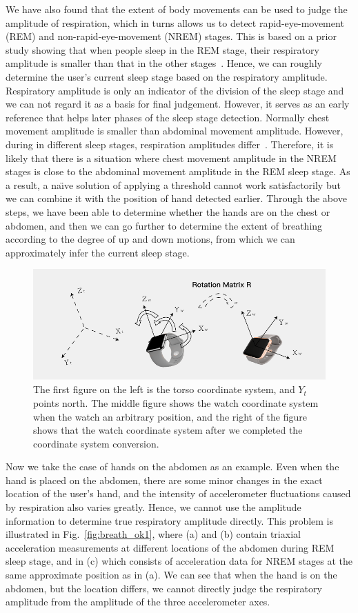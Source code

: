 We have also found that the extent of body movements can be used to judge the amplitude of respiration, which in turns allows us to detect
rapid-eye-movement (REM) and non-rapid-eye-movement (NREM) stages. This is based on a prior study showing that when people sleep in the REM
stage, their respiratory amplitude is smaller than that in the other stages~\cite{respiratory1982}. Hence, we can roughly determine the
user's current sleep stage based on the respiratory amplitude. Respiratory amplitude is only an indicator of the division of the sleep
stage and we can not regard it as a basis for final judgement.  {However, it serves as an early reference that helps later phases of the
sleep stage detection. Normally chest movement amplitude is smaller than abdominal movement amplitude. However, during in different sleep
stages, respiration amplitudes differ~\cite{respiratory}. Therefore, it is likely that there is a situation where chest movement amplitude
in the NREM stages is close to the abdominal movement amplitude in the REM sleep stage. As a result, a na\"{\i}ve solution of applying a
threshold cannot work satisfactorily but we can combine it with the position of hand detected earlier. Through the above steps, we have
been able to determine whether the hands are on the chest or abdomen, and then we can go further to determine the extent of breathing
according to the degree of up and down motions, from which we can approximately infer the current sleep stage}.
\begin{figure}[!t]
\centering
      \includegraphics[width=0.67\linewidth]{Figures/watch.pdf}
  \caption{The first figure on the left is the torso coordinate system, and $Y_t$ points north. The middle figure shows the watch coordinate system when the watch an arbitrary position, and the right of the figure shows that the  watch coordinate system after we completed the coordinate system conversion.}\label{fig:watch}
\end{figure}

 Now we take the case of hands on the abdomen as an example. Even when the hand is placed on the abdomen, there are
some minor changes in the exact location of the user's hand, and the intensity of accelerometer fluctuations caused by respiration also
varies greatly. Hence, we cannot use the amplitude information to determine true respiratory amplitude directly. This problem is
illustrated in Fig.~\ref{fig:breath_ok1}, where (a) and (b) contain triaxial acceleration measurements at different locations of the
abdomen during REM sleep stage, and in (c) which consists of acceleration data for NREM stages at the same approximate position as in (a).
{We can see that when the hand is on the abdomen, but the location differs, we cannot directly judge the respiratory amplitude from the
amplitude of the three accelerometer axes.}

